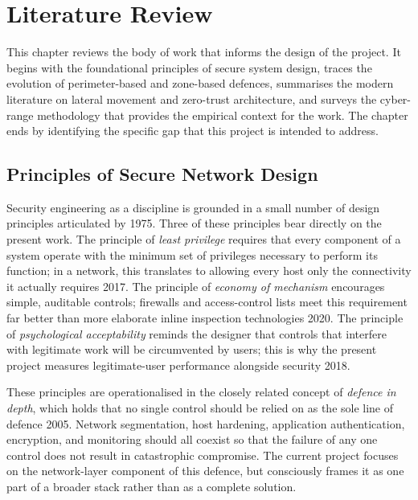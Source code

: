 \chapter{Literature Review}
\label{ch:literature}

This chapter reviews the body of work that informs the design of the project. It begins with the foundational principles of secure system design, traces the evolution of perimeter-based and zone-based defences, summarises the modern literature on lateral movement and zero-trust architecture, and surveys the cyber-range methodology that provides the empirical context for the work. The chapter ends by identifying the specific gap that this project is intended to address.

\section{Principles of Secure Network Design}

Security engineering as a discipline is grounded in a small number of design principles articulated by \textcite{Saltzer and Schroeder}{1975}. Three of these principles bear directly on the present work. The principle of \emph{least privilege} requires that every component of a system operate with the minimum set of privileges necessary to perform its function; in a network, this translates to allowing every host only the connectivity it actually requires \parencite{Stallings}{2017}. The principle of \emph{economy of mechanism} encourages simple, auditable controls; firewalls and access-control lists meet this requirement far better than more elaborate inline inspection technologies \parencite{Anderson}{2020}. The principle of \emph{psychological acceptability} reminds the designer that controls that interfere with legitimate work will be circumvented by users; this is why the present project measures legitimate-user performance alongside security \parencite{Bishop}{2018}.

These principles are operationalised in the closely related concept of \emph{defence in depth}, which holds that no single control should be relied on as the sole line of defence \parencite{Northcutt et al.}{2005}. Network segmentation, host hardening, application authentication, encryption, and monitoring should all coexist so that the failure of any one control does not result in catastrophic compromise. The current project focuses on the network-layer component of this defence, but consciously frames it as one part of a broader stack rather than as a complete solution.

